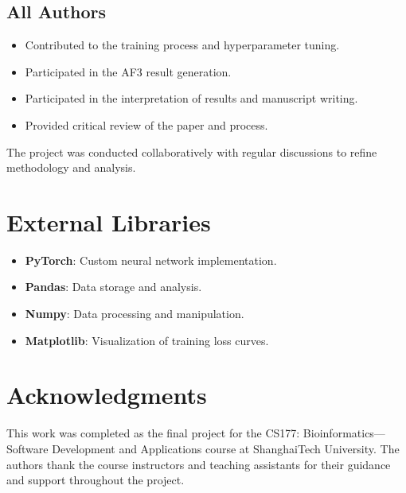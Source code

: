 \documentclass[unnumsec,webpdf,contemporary,large]{oup-authoring-template}
\theoremstyle{thmstyleone}%
\theoremstyle{thmstyletwo}%
\theoremstyle{thmstylethree}%
\begin{document}
\subsection{All Authors}
\begin{itemize}
    \item Contributed to the training process and hyperparameter tuning.
    \item Participated in the AF3 result generation.
    \item Participated in the interpretation of results and manuscript writing.
    \item Provided critical review of the paper and process.
\end{itemize}  

The project was conducted collaboratively with regular 
discussions to refine methodology and analysis.

\section{External Libraries}

\begin{itemize}
    \item \textbf{PyTorch}: Custom neural network implementation.
    \item \textbf{Pandas}: Data storage and analysis.
    \item \textbf{Numpy}: Data processing and manipulation.
    \item \textbf{Matplotlib}: Visualization of training loss curves.
\end{itemize}

\section{Acknowledgments}
This work was completed as the final project for the CS177: Bioinformatics—Software Development 
and Applications course at ShanghaiTech University. 
The authors thank the course instructors and teaching assistants 
for their guidance and support throughout the project.




\end{document}
